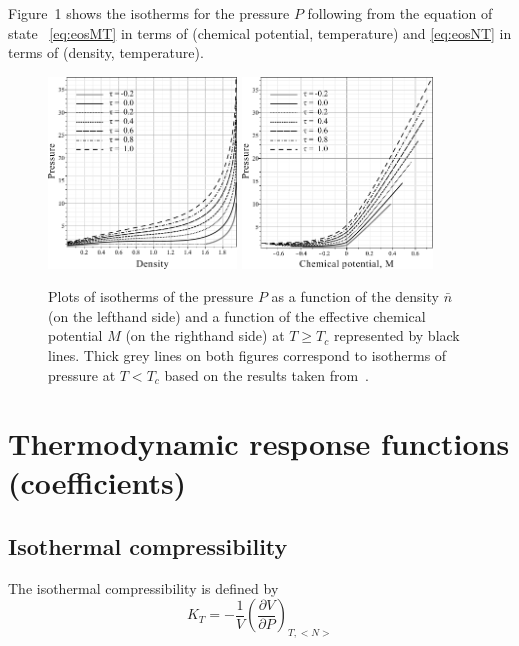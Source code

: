 \documentclass[12pt]{article}
\begin{document}
	Figure~1 shows the isotherms for the pressure $P$ following from the equation of state ~\eqref{eq:eosMT} in terms of (chemical potential, temperature)  and \eqref{eq:eosNT} in terms of (density, temperature).
	\begin{figure}[h!]
		\includegraphics[width=0.446\textwidth]{f1a1.pdf} 
		\includegraphics[width=0.45\textwidth]{f1b1.pdf} 
		\vskip-3mm\caption{Plots of isotherms of the pressure $P$ as a function of the density $\bar n$ (on the lefthand side) and a function of the effective chemical potential $M$ (on the righthand side) at $T \geq T_c$ represented by black lines. Thick grey lines on both figures correspond to isotherms of pressure at $T < T_c$ based on the results taken from~\cite{KozlovskiiDobush2020}. 
		}\label{fig1}
	\end{figure}
	
	\section{Thermodynamic response functions (coefficients)}
	
	\subsection{Isothermal compressibility}
	The isothermal compressibility is defined by
	\begin{equation}
		\label{def:isotherm_compres}
		K_T = -\frac{1}{V}\left(\frac{\partial V}{\partial P}\right)_{T,<N>}
	\end{equation}
	
\end{document}
